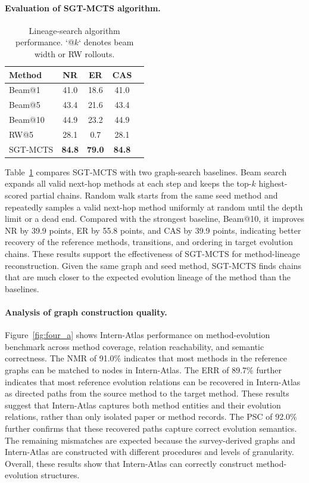 \documentclass{llmxive}
\begin{document}

\paragraph{Evaluation of SGT-MCTS algorithm.} 
\begin{table}[t]
\centering
\vspace{-1.5em}
\begin{tabular}{lcccc}
\toprule
\textbf{Method} & \textbf{NR} & \textbf{ER} & \textbf{CAS} \\
\midrule
Beam@1 & 41.0 & 18.6 & 41.0 \\
Beam@5 & 43.4 & 21.6 & 43.4  \\
Beam@10 & 44.9 & 23.2 & 44.9 \\
RW@5 & 28.1 & 0.7 & 28.1 \\
\rowcolor{lightblue} SGT-MCTS & \textbf{84.8} & \textbf{79.0} & \textbf{84.8} \\
\bottomrule
\end{tabular}
\vspace{-1.0em}

\caption{Lineage-search algorithm performance. `@$k$` denotes beam width or RW rollouts.}
\label{tab:lineage-search-results}
\end{table}
Table~\ref{tab:lineage-search-results} compares SGT-MCTS with two graph-search baselines. Beam search expands all valid next-hop methods at each step and keeps the top-$k$ highest-scored partial chains. Random walk starts from the same seed method and repeatedly samples a valid next-hop method uniformly at random until the depth limit or a dead end. Compared with the strongest baseline, Beam@10, it improves NR by 39.9 points, ER by 55.8 points, and CAS by 39.9 points, indicating better recovery of the reference methods, transitions, and ordering in target evolution chains. These results support the effectiveness of SGT-MCTS for method-lineage reconstruction. Given the same graph and seed method, SGT-MCTS finds chains that are much closer to the expected evolution lineage of the method than the baselines.

\paragraph{Analysis of graph construction quality.}
Figure~\ref{fig:four_a} shows Intern-Atlas performance on method-evolution benchmark across method coverage, relation reachability, and semantic correctness. The NMR of 91.0\% indicates that most methods in the reference graphs can be matched to nodes in Intern-Atlas.  The ERR of 89.7\% further indicates that most reference evolution relations can be recovered in Intern-Atlas as directed paths from the source method to the target method. These results suggest that Intern-Atlas captures both method entities and their evolution relations, rather than only isolated paper or method records. The PSC of 92.0\% further confirms that these recovered paths capture correct evolution semantics. The remaining mismatches are expected because the survey-derived graphs and Intern-Atlas are constructed with different procedures and levels of granularity. Overall, these results show that Intern-Atlas can correctly construct method-evolution structures.
\end{document}
